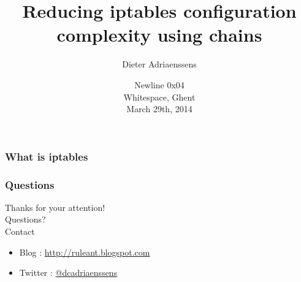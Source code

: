 \documentclass[14pt]{beamer}
\title[Reduce iptables config complexity]{Reducing iptables configuration complexity using chains}
\author{Dieter Adriaenssens}
\date[29Mar2014]{Newline 0x04\\
Whitespace, Ghent\\
March 29th, 2014}
\begin{document}
  \begin{frame}
  \titlepage
  \end{frame}
  \begin{frame}
    \frametitle{What is iptables}
  \end{frame}
  \begin{frame}
   \frametitle{Questions}
    Thanks for your attention!\\
    Questions?\\
    Contact
    \begin{itemize}
      \item Blog : \href{http://ruleant.blogspot.com/}{http://ruleant.blogspot.com}
      \item Twitter : \href{https://twitter.com/dcadriaenssens}{@dcadriaenssens}
    \end{itemize}
  \end{frame}
\end{document}
